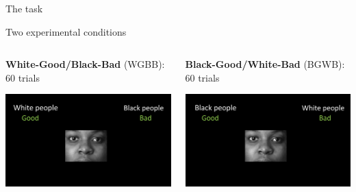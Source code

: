 \documentclass[compress]{beamer}
\begin{document}
\begin{frame}{The task}

\begin{block}{Two experimental conditions}
	\begin{columns}[T]
		\begin{column}{.50\linewidth}
			\begin{center}
				\textbf{White-Good/Black-Bad} (WGBB): \\60 trials
			\end{center}
			
			\centering \includegraphics[width=\linewidth]{img/wgbb.png}
		\end{column}
		
		\begin{column}{.50\linewidth}
			\begin{center}
				\textbf{Black-Good/White-Bad} (BGWB): \\ 60 trials
			\end{center}
			
			\centering \includegraphics[width=\linewidth]{img/bgwb.png}
		\end{column}
	\end{columns}
\end{block}

\end{frame}
\end{document}
